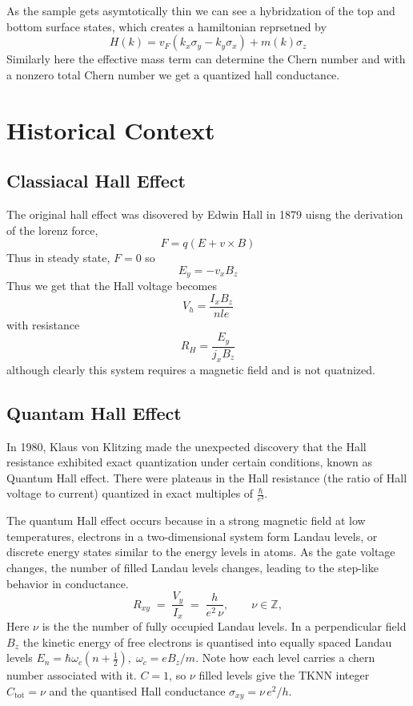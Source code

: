 \documentclass[aps,prb,twocolumn]{revtex4-2}
\begin{document}
      As the sample gets asymtotically thin we can see a hybridzation of the top and bottom surface states, which creates a hamiltonian reprsetned by
      \[H(k)=v_F(k_x\sigma_y-k_y\sigma_x)+m(k)\sigma_z\]
      Similarly here the effective mass term can determine the Chern number and with a nonzero total Chern number we get a quantized hall conductance. 

  \section{Historical Context}
    \subsection{Classiacal Hall Effect}
      The original hall effect was disovered by Edwin Hall in 1879 uisng the derivation of the lorenz force, 
      \[F=q(E+v\times B)\]
      Thus in steady state, $F=0$ so 
      \[E_y = -v_xB_z\]
      Thus we get that the Hall voltage becomes 
      \[V_h = \frac{I_x B_z}{nle}\]
      with resistance
      \[R_H=\frac{E_y}{j_xB_z}\]
      although clearly this system requires a magnetic field and is not quatnized.
    \subsection{Quantam Hall Effect}
    In 1980, Klaus von Klitzing made the unexpected discovery that the Hall resistance exhibited exact quantization under certain conditions, known as Quantum Hall effect. There were plateaus in the Hall resistance (the ratio of Hall voltage to current) quantized in exact multiples of $\frac{\hbar}{e²}$. 

    The quantum Hall effect occurs because in a strong magnetic field at low temperatures, electrons in a two-dimensional system form Landau levels, or discrete energy states similar to the energy levels in atoms. As the gate voltage changes, the number of filled Landau levels changes, leading to the step-like behavior in conductance.
    \begin{equation}
      R_{xy} \;=\;\frac{V_{y}}{I_{x}}
      \;=\;\frac{h}{e^{2}\,\nu},
      \qquad
      \nu\in\mathbb{Z},
      \label{eq:intQHE}
    \end{equation}
    Here $\nu$ is the the number of fully occupied Landau levels.  In a perpendicular field $B_{z}$ the kinetic energy of free electrons is quantised into equally spaced Landau levels
    \( E_{n}=\hbar\omega_{c}(n+\tfrac12), \; \omega_{c}=eB_{z}/m. \)
    Note how each level carries a chern number associated with it. $C=1$, so $\nu$ filled levels give the TKNN integer $C_{\text{tot}}=\nu$ and the quantised Hall conductance $\sigma_{xy}=\nu\,e^{2}/h$.
\end{document}
